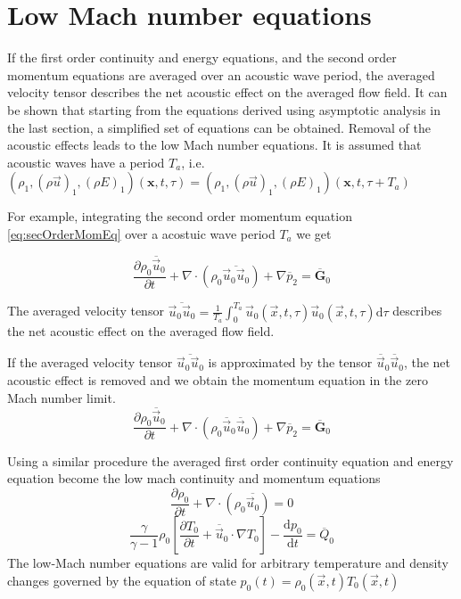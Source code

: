 	\section{Low Mach number equations}
	If the first order continuity and energy equations, and the second order momentum equations are averaged over an acoustic wave period, the averaged velocity tensor describes the net acoustic effect on the averaged flow field. 
	It can be shown that starting from the equations derived using asymptotic analysis in the last section, a simplified set of equations can be obtained. Removal of the acoustic effects leads to the low Mach number equations.
	It is assumed that acoustic waves have a period $T_a$, i.e. $(\rho_1,(\rho \vec{u})_1,(\rho E)_1)(\mathbf{x}, t, \tau) = (\rho_1,(\rho \vec{u})_1,(\rho E)_1)(\mathbf{x}, t, \tau+ T_a)$
	
	For example, integrating the second order momentum equation \eqref{eq:secOrderMomEq} over a acostuic wave period $T_a$ we get
	
	\begin{equation}
	\frac{\partial \rho_0 \overline{\vec{u}}_0 }{\partial t}  + \nabla \cdot (\rho_0  \overline{\vec{u}_0\vec{u}_0}) + \nabla \overline{p}_2 = \overline{\mathbf{G}}_0
	\end{equation}
	
	The averaged velocity tensor $\overline{\vec{u}_0\vec{u}_0} = \frac{1}{T_a}\int_{0}^{T_a}\vec{u}_0(\vec{x},t,\tau)\vec{u}_0(\vec{x},t,\tau)\text{d}\tau$ 
	describes the net acoustic effect on the averaged flow field.
	
	If the averaged velocity tensor  $\overline{\vec{u}_0\vec{u}_0}$ is approximated by the tensor  $\overline{\vec{u}}_0\overline{\vec{u}}_0$, the net acoustic effect is removed and we obtain the momentum equation in the zero Mach number limit.
	\begin{equation}
	\frac{\partial \rho_0 \overline{\vec{u}}_0 }{\partial t}  + \nabla \cdot (\rho_0  \overline{\vec{u}}_0\overline{\vec{u}}_0) + \nabla \overline{p}_2 = \overline{\mathbf{G}}_0
	\end{equation}
	
	Using a similar procedure the averaged first order continuity equation and energy equation become the low mach continuity and momentum equations
	\begin{equation}
	\frac{\partial \rho_0 }{\partial t}  + \nabla \cdot (\rho_0  \overline{\vec{u}_0}) = 0
	\end{equation}
	\begin{equation}
	\frac{\gamma}{\gamma -1} \rho_0 \left[\frac{\partial T_0}{\partial t}   + \overline{\vec{u}}_0 \cdot\nabla T_0 \right] - \frac{\text{d}p_0}{\text{d}t} = \overline{Q}_0
	\end{equation} 
	The low-Mach number equations are valid for arbitrary temperature and density changes governed by the equation of state $p_0(t) = \rho_0(\vec{x},t)T_0(\vec{x},t)$
	
